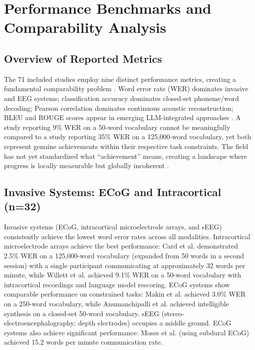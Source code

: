 
\section{Performance Benchmarks and Comparability Analysis}
\label{sec:benchmarks}

\subsection{Overview of Reported Metrics}

The 71 included studies employ nine distinct performance metrics, creating a fundamental comparability problem \cite{Panayotov2015,Ardila2020,Berezutskaya2022}. Word error rate (WER) dominates invasive and EEG systems; classification accuracy dominates closed-set phoneme/word decoding; Pearson correlation dominates continuous acoustic reconstruction; BLEU and ROUGE scores appear in emerging LLM-integrated approaches \cite{Abdulghani2023}. A study reporting 9\% WER on a 50-word vocabulary cannot be meaningfully compared to a study reporting 35\% WER on a 125,000-word vocabulary, yet both represent genuine achievements within their respective task constraints. The field has not yet standardized what ``achievement'' means, creating a landscape where progress is locally measurable but globally incoherent \cite{Willett2024Benchmark}.

\subsection{Invasive Systems: ECoG and Intracortical (n=32)}

Invasive systems (ECoG, intracortical microelectrode arrays, and sEEG) consistently achieve the lowest word error rates across all modalities. Intracortical microelectrode arrays achieve the best performance: Card et al. \cite{Card2024} demonstrated 2.5\% WER on a 125,000-word vocabulary (expanded from 50 words in a second session) with a single participant communicating at approximately 32 words per minute, while Willett et al. \cite{Willett2023} achieved 9.1\% WER on a 50-word vocabulary with intracortical recordings and language model rescoring. ECoG systems show comparable performance on constrained tasks: Makin et al. \cite{Makin2020} achieved 3.0\% WER on a 250-word vocabulary, while Anumanchipalli et al. \cite{Anumanchipalli2019} achieved intelligible synthesis on a closed-set 50-word vocabulary. sEEG (stereo-electroencephalography: depth electrodes) occupies a middle ground. ECoG systems also achieve significant performance: Moses et al. \cite{Moses2021} (using subdural ECoG) achieved 15.2 words per minute communication rate.

